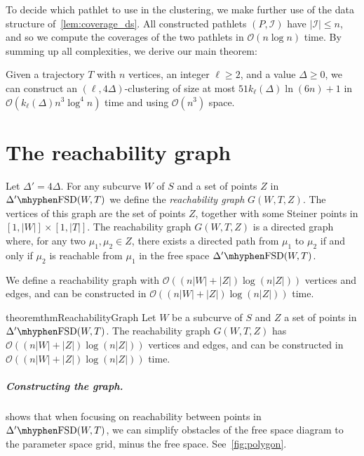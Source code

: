 \documentclass[a4paper,UKenglish,cleveref,thm-restate,notab]{lipics-v2021}
\newcommand{\FSD}[1][\Delta'] {\ensuremath{#1}\mhyphen\mathrm{FSD}}
\newcommand{\bigO}{\mathcal{O}}
\newcommand{\I}{\mathcal{I}}
\begin{document}
    To decide which pathlet to use in the clustering, we make further use of the data structure of~\cref{lem:coverage_ds}.
    All constructed pathlets $(P, \I)$ have $|\I| \leq n$, and so we compute the coverages of the two pathlets in $\bigO(n \log n)$ time.
    By summing up all complexities, we derive our main theorem:
    
    \begin{theorem}
    \label{thm:yes-no-no}
        Given a trajectory $T$ with $n$ vertices, an integer $\ell \geq 2$, and  a value $\Delta \geq 0$, we can construct an $(\ell, 4\Delta)$-clustering of size at most $51 k_\ell(\Delta) \ln (6n) + 1$ in $\bigO(k_\ell(\Delta) n^3 \log^4 n)$ time and using $\bigO(n^3)$ space.
    \end{theorem}

\section{The reachability graph}
\label{sec:reachability_graph}

    Let $\Delta' = 4\Delta$.
    For any subcurve $W$ of $S$ and a set of points $Z$ in $\FSD(W, T)$ we define the \emph{reachability graph} $G(W, T, Z)$.
    The vertices of this graph are the set of points $Z$, together with some Steiner points in $[1, |W|] \times [1, |T|]$.
    The reachability graph $G(W, T, Z)$ is a directed graph where, for any two $\mu_1, \mu_2 \in Z$, there exists a directed path from $\mu_1$ to $\mu_2$ if and only if $\mu_2$ is reachable from $\mu_1$ in the free space $\FSD(W, T)$.
    
We define a reachability graph with $\bigO((n |W| + |Z|) \log (n|Z|))$ vertices and edges, and can be constructed in $\bigO((n |W| + |Z|) \log (n|Z|))$ time.

    \begin{restatable}{theorem}{thmReachabilityGraph}
    \label{thm:reachability_graph}
        Let $W$ be a subcurve of $S$ and $Z$ a set of points in $\FSD(W, T)$.
        The reachability graph $G(W, T, Z)$ has $\bigO((n |W| + |Z|) \log (n|Z|))$ vertices and edges, and can be constructed in $\bigO((n |W| + |Z|) \log (n|Z|))$ time.
    \end{restatable}


    \subparagraph{Constructing the graph.}
     shows that when focusing on reachability between points in $\FSD(W, T)$, we can simplify obstacles of the free space diagram to the parameter space grid, minus the free space.
    See~\cref{fig:polygon}.
   
\end{document}
